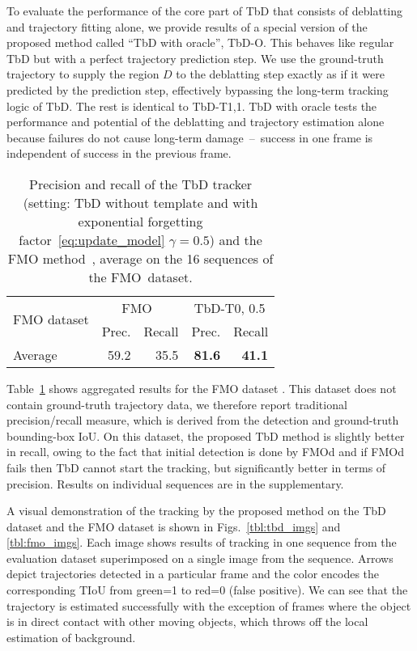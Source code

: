 \documentclass[10pt,twocolumn,letterpaper]{article}
\begin{document}
To evaluate the performance of the core part of TbD that consists of deblatting and trajectory fitting alone, we provide results of a special version of the proposed method called ``TbD with oracle'', TbD-O. This behaves like regular TbD but with a perfect trajectory prediction step. We use the ground-truth trajectory to supply the region $D$ to the deblatting step exactly as if it were predicted by the prediction step, effectively bypassing the long-term tracking logic of TbD. The rest is identical to TbD-T1,1. TbD with oracle tests the performance and potential of the deblatting and trajectory estimation alone because failures do not cause long-term damage~--~success in one frame is independent of success in the previous frame.


\begin{table}
\begin{center}
\begin{tabular}{l|r|r|r|r}
\hline
\multirow{2}{*}{FMO dataset}  &  \multicolumn{2}{c|}{FMO~\cite{fmo}} &  \multicolumn{2}{c}{TbD-T0, 0.5}  \\  \cline{2-5}
 &  Prec.  & Recall  & Prec. & Recall  \\ 
\hline
Average &  59.2 & 35.5 & \textbf{81.6} & \textbf{41.1} \\
\hline
\end{tabular}
\end{center}
\caption{Precision and recall of the TbD tracker (setting: TbD without template and with exponential forgetting factor~\eqref{eq:update_model} $\gamma=0.5$) and the FMO method~\cite{fmo}, average on the 16 sequences of the FMO~dataset. 
}
\label{tbl:fmo}
\end{table}




%
 Table~\ref{tbl:fmo} shows aggregated results for the FMO dataset \cite{fmo}. This dataset does not contain ground-truth trajectory data, we therefore report traditional precision/recall measure, which is derived from the detection and ground-truth bounding-box IoU. On this dataset, the proposed TbD method is slightly better in recall, owing to the fact that initial detection is done by FMOd and if FMOd fails then TbD cannot start the tracking, but significantly better in terms of precision. Results on individual sequences are in the supplementary.

A visual demonstration of the tracking by the proposed method on the TbD dataset and the FMO dataset is shown in Figs.~\ref{tbl:tbd_imgs} and \ref{tbl:fmo_imgs}.
Each image shows results of tracking in one sequence from the evaluation dataset superimposed on a single image from the sequence. Arrows depict trajectories detected in a particular frame and the color encodes the corresponding TIoU from green=1 to red=0 (false positive). We can see that the trajectory is estimated successfully with the exception of frames where the object is in direct contact with other moving objects, which throws off the local estimation of background.
\end{document}

